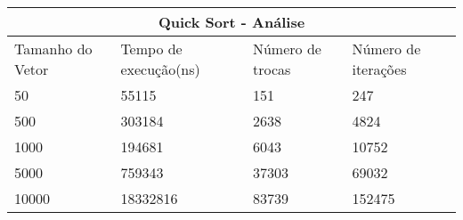 \documentclass[12pt]{article}
\begin{document}
    \begin{tabular}{ |p{3cm}||p{3cm}|p{3cm}|p{3cm}|  }
        \hline
        \multicolumn{4}{|c|}{Quick Sort - Análise} \\
        \hline
        Tamanho do Vetor & Tempo de execução(ns) &Número de trocas & Número de iterações\\
        \hline
        50&55115&151&247\\
        500&303184&2638&4824\\
        1000&194681&6043&10752\\
        5000&759343&37303&69032\\
        10000&18332816&83739&152475\\
        \hline
    \end{tabular}
\end{document}
